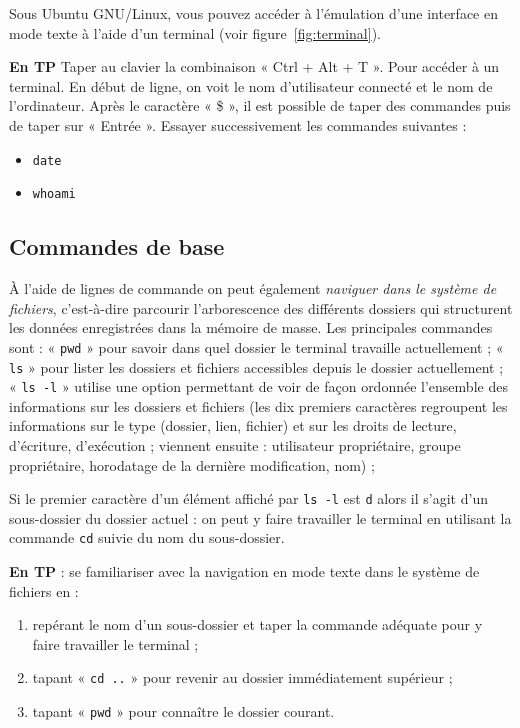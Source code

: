Sous Ubuntu GNU/Linux, vous pouvez accéder à l'émulation d'une interface en mode texte à l'aide d'un terminal (voir figure~\ref{fig:terminal}). 

\textbf{En TP} Taper au clavier la combinaison « Ctrl + Alt + T ». Pour accéder à un terminal. En début de ligne, on voit le nom d'utilisateur connecté et le nom de l'ordinateur. Après le caractère « \$ », il est possible de taper des commandes puis de taper sur « Entrée ». Essayer successivement les commandes suivantes :
\begin{itemize}
 \item[] \texttt{date}
 \item[] \texttt{whoami}
\end{itemize}

\subsection{Commandes de base}
À l'aide de lignes de commande on peut également \textit{naviguer dans le système de fichiers}, c'est-à-dire parcourir l'arborescence des différents dossiers qui structurent les données enregistrées dans la mémoire de masse. Les principales commandes sont :
« \texttt{pwd} » pour savoir dans quel dossier le terminal travaille actuellement ; 
« \texttt{ls} » pour lister les dossiers et fichiers accessibles depuis le dossier actuellement ;
« \texttt{ls -l} » utilise une option permettant de voir de façon ordonnée l'ensemble des informations sur les dossiers et fichiers (les dix premiers caractères regroupent les informations sur le type (dossier, lien, fichier) et sur les droits de lecture, d'écriture, d'exécution ; viennent ensuite : utilisateur propriétaire, groupe propriétaire, horodatage de la dernière modification, nom) ;

Si le premier caractère d'un élément affiché par \texttt{ls -l} est \texttt{d} alors il s'agit d'un sous-dossier du dossier actuel : on peut y faire travailler le terminal en utilisant la commande \texttt{cd} suivie du nom du sous-dossier.

\textbf{En TP} : se familiariser avec la navigation en mode texte dans le système de fichiers en :
\begin{enumerate}
\item repérant le nom d'un sous-dossier et taper la commande adéquate pour y faire travailler le terminal ;
\item tapant « \texttt{cd ..} » pour revenir au dossier immédiatement supérieur ;
\item tapant « \texttt{pwd} » pour connaître le dossier courant.
\end{enumerate}

